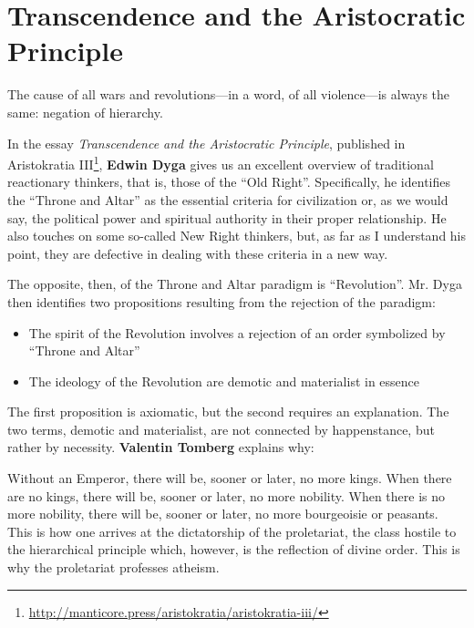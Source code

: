 \section{Transcendence and the Aristocratic Principle}

\begin{quotex}
The cause of all wars and revolutions---in a word, of all violence---is always the same: negation of hierarchy.
\end{quotex}


In the essay \emph{Transcendence and the Aristocratic Principle}, published in Aristokratia III\footnote{\url{http://manticore.press/aristokratia/aristokratia-iii/}}, \textbf{Edwin Dyga} gives us an excellent overview of traditional reactionary thinkers, that is, those of the ``Old Right''. Specifically, he identifies the ``Throne and Altar'' as the essential criteria for civilization or, as we would say, the political power and spiritual authority in their proper relationship. He also touches on some so-called New Right thinkers, but, as far as I understand his point, they are defective in dealing with these criteria in a new way.

The opposite, then, of the Throne and Altar paradigm is ``Revolution''. Mr. Dyga then identifies two propositions resulting from the rejection of the paradigm:

\begin{itemize}


\item The spirit of the Revolution involves a rejection of an order symbolized by ``Throne and Altar''

\item The ideology of the Revolution are demotic and materialist in essence
\end{itemize}


The first proposition is axiomatic, but the second requires an explanation. The two terms, demotic and materialist, are not connected by happenstance, but rather by necessity. \textbf{Valentin Tomberg} explains why:

\begin{quotex}
Without an Emperor, there will be, sooner or later, no more kings. When there are no kings, there will be, sooner or later, no more nobility. When there is no more nobility, there will be, sooner or later, no more bourgeoisie or peasants. This is how one arrives at the dictatorship of the proletariat, the class hostile to the hierarchical principle which, however, is the reflection of divine order. This is why the proletariat professes atheism.
\end{quotex}


